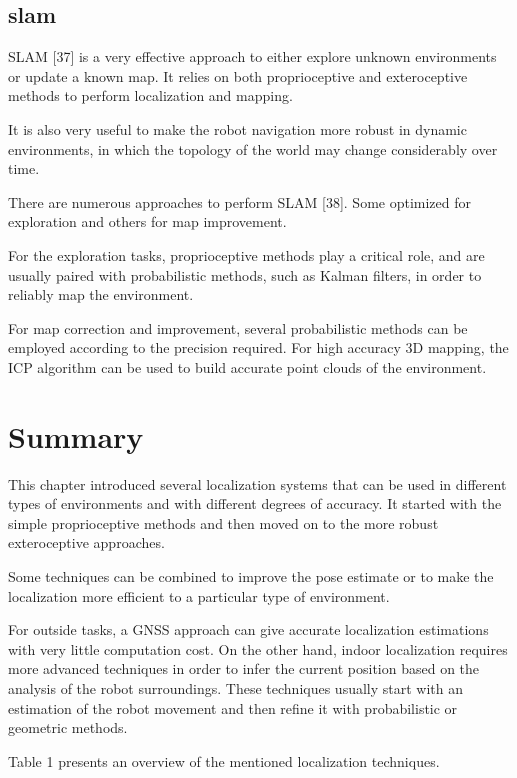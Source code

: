 \subsection{\gls{slam}}

SLAM [37] is a very effective approach to either explore unknown environments or update a known map. It relies on both proprioceptive and exteroceptive methods to perform localization and mapping.

It is also very useful to make the robot navigation more robust in dynamic environments, in which the topology of the world may change considerably over time.

There are numerous approaches to perform  SLAM [38]. Some optimized for exploration and others for map improvement.

For the exploration tasks, proprioceptive methods play a critical role, and are usually paired with probabilistic methods, such as Kalman filters, in order to reliably map the environment.

For map correction and improvement, several probabilistic methods can be employed according to the precision required. For high accuracy 3D mapping, the ICP algorithm can be used to build accurate point clouds of the environment.



\section{Summary}

This chapter introduced several localization systems that can be used in different types of environments and with different degrees of accuracy. It started with the simple proprioceptive methods and then moved on to the more robust exteroceptive approaches.

Some techniques can be combined to improve the pose estimate or to make the localization more efficient to a particular type of environment.

For outside tasks, a GNSS approach can give accurate localization estimations with very little computation cost. On the other hand, indoor localization requires more advanced techniques in order to infer the current position based on the analysis of the robot surroundings. These techniques usually start with an estimation of the robot movement and then refine it with probabilistic or geometric methods.

Table 1 presents an overview of the mentioned localization techniques.

